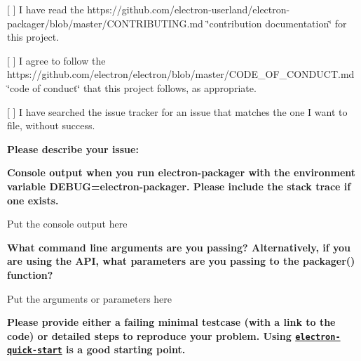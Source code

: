 
\begin{DoxyItemize}
\item \mbox{[} \mbox{]} I have read the https\+://github.com/electron-\/userland/electron-\/packager/blob/master/\+C\+O\+N\+T\+R\+I\+B\+U\+T\+I\+N\+G.\+md \char`\"{}contribution documentation\char`\"{} for this project.
\item \mbox{[} \mbox{]} I agree to follow the https\+://github.com/electron/electron/blob/master/\+C\+O\+D\+E\+\_\+\+O\+F\+\_\+\+C\+O\+N\+D\+U\+C\+T.\+md \char`\"{}code of conduct\char`\"{} that this project follows, as appropriate.
\item \mbox{[} \mbox{]} I have searched the issue tracker for an issue that matches the one I want to file, without success.
\end{DoxyItemize}

{\bfseries Please describe your issue\+:}

{\bfseries Console output when you run electron-\/packager with the environment variable {\ttfamily D\+E\+B\+UG=electron-\/packager}. Please include the stack trace if one exists.}


\begin{DoxyCode}
Put the console output here
\end{DoxyCode}


{\bfseries What command line arguments are you passing? Alternatively, if you are using the A\+PI, what parameters are you passing to the {\ttfamily packager()} function?}


\begin{DoxyCode}
Put the arguments or parameters here
\end{DoxyCode}


{\bfseries Please provide either a failing minimal testcase (with a link to the code) or detailed steps to reproduce your problem. Using \href{https://github.com/electron/electron-quick-start}{\tt electron-\/quick-\/start} is a good starting point.} 